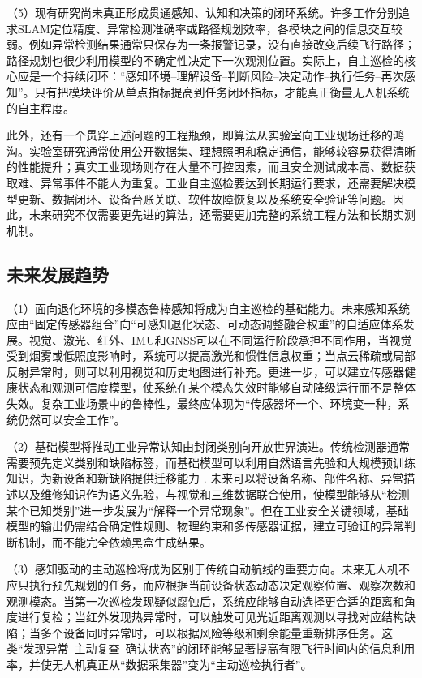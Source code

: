 （5）现有研究尚未真正形成贯通感知、认知和决策的闭环系统。许多工作分别追求SLAM定位精度、异常检测准确率或路径规划效率，各模块之间的信息交互较弱。例如异常检测结果通常只保存为一条报警记录，没有直接改变后续飞行路径；路径规划也很少利用模型的不确定性决定下一次观测位置。实际上，自主巡检的核心应是一个持续闭环：“感知环境--理解设备--判断风险--决定动作--执行任务--再次感知”。只有把模块评价从单点指标提高到任务闭环指标，才能真正衡量无人机系统的自主程度。

此外，还有一个贯穿上述问题的工程瓶颈，即算法从实验室向工业现场迁移的鸿沟。实验室研究通常使用公开数据集、理想照明和稳定通信，能够较容易获得清晰的性能提升；真实工业现场则存在大量不可控因素，而且安全测试成本高、数据获取难、异常事件不能人为重复。工业自主巡检要达到长期运行要求，还需要解决模型更新、数据闭环、设备台账关联、软件故障恢复以及系统安全验证等问题。因此，未来研究不仅需要更先进的算法，还需要更加完整的系统工程方法和长期实测机制。

\subsection{未来发展趋势}

（1）面向退化环境的多模态鲁棒感知将成为自主巡检的基础能力。未来感知系统应由“固定传感器组合”向“可感知退化状态、可动态调整融合权重”的自适应体系发展。视觉、激光、红外、IMU和GNSS可以在不同运行阶段承担不同作用，当视觉受到烟雾或低照度影响时，系统可以提高激光和惯性信息权重；当点云稀疏或局部反射异常时，则可以利用视觉和历史地图进行补充。更进一步，可以建立传感器健康状态和观测可信度模型，使系统在某个模态失效时能够自动降级运行而不是整体失效。复杂工业场景中的鲁棒性，最终应体现为“传感器坏一个、环境变一种，系统仍然可以安全工作”。

（2）基础模型将推动工业异常认知由封闭类别向开放世界演进。传统检测器通常需要预先定义类别和缺陷标签，而基础模型可以利用自然语言先验和大规模预训练知识，为新设备和新缺陷提供迁移能力
\cite{radford2021learning,jeong2023winclip,oquab2024dinov2}. 未来可以将设备名称、部件名称、异常描述以及维修知识作为语义先验，与视觉和三维数据联合使用，使模型能够从“检测某个已知类别”进一步发展为“解释一个异常现象”。但在工业安全关键领域，基础模型的输出仍需结合确定性规则、物理约束和多传感器证据，建立可验证的异常判断机制，而不能完全依赖黑盒生成结果。

（3）感知驱动的主动巡检将成为区别于传统自动航线的重要方向。未来无人机不应只执行预先规划的任务，而应根据当前设备状态动态决定观察位置、观察次数和观测模态。当第一次巡检发现疑似腐蚀后，系统应能够自动选择更合适的距离和角度进行复检；当红外发现热异常时，可以触发可见光近距离观测以寻找对应结构缺陷；当多个设备同时异常时，可以根据风险等级和剩余能量重新排序任务。这类“发现异常--主动复查--确认状态”的闭环能够显著提高有限飞行时间内的信息利用率，并使无人机真正从“数据采集器”变为“主动巡检执行者”。

